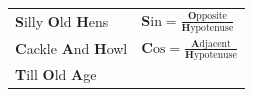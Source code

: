 {\begin{center}
\begin{xtabular*}{\mytablewidth}[t]{|p{10\mystarwidth}|p{10\mystarwidth}|}
    
        \textbf{S}illy \textbf{O}ld \textbf{H}ens &
    
    
        
                  \begin{math}\mathbf{S}\mathrm{in}=\frac{\mathbf{O}\mathrm{pposite}}{\mathbf{H}\mathrm{ypotenuse}}\end{math}
     \tabularnewline{}
    
    
        \textbf{C}ackle \textbf{A}nd \textbf{H}owl &
    
    
        
                  \begin{math}\mathbf{C}\mathrm{os}=\frac{\mathbf{A}\mathrm{djacent}}{\mathbf{H}\mathrm{ypotenuse}}\end{math}
     \tabularnewline{}
    
    
        \textbf{T}ill \textbf{O}ld \textbf{A}ge &
    
    
        

\end{xtabular*}
\end{center}}
